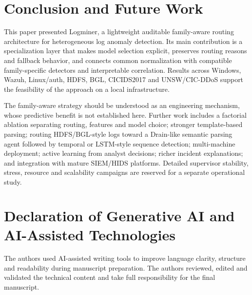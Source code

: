 \documentclass[conference]{IEEEtran}
\newcommand{\logminer}{Logminer}
\begin{document}
\section{Conclusion and Future Work}
This paper presented \logminer, a lightweight auditable family-aware routing architecture for heterogeneous log anomaly detection. Its main contribution is a specialization layer that makes model selection explicit, preserves routing reasons and fallback behavior, and connects common normalization with compatible family-specific detectors and interpretable correlation. Results across Windows, Wazuh, Linux/auth, HDFS, BGL, CICIDS2017 and UNSW/CIC-DDoS support the feasibility of the approach on a local infrastructure.

The family-aware strategy should be understood as an engineering mechanism, whose predictive benefit is not established here. Further work includes a factorial ablation separating routing, features and model choice; stronger template-based parsing; routing HDFS/BGL-style logs toward a Drain-like semantic parsing agent followed by temporal or LSTM-style sequence detection; multi-machine deployment; active learning from analyst decisions; richer incident explanations; and integration with mature SIEM/HIDS platforms. Detailed supervisor stability, stress, resource and scalability campaigns are reserved for a separate operational study.

\section*{Declaration of Generative AI and AI-Assisted Technologies}
The authors used AI-assisted writing tools to improve language clarity, structure and readability during manuscript preparation. The authors reviewed, edited and validated the technical content and take full responsibility for the final manuscript.
\end{document}
